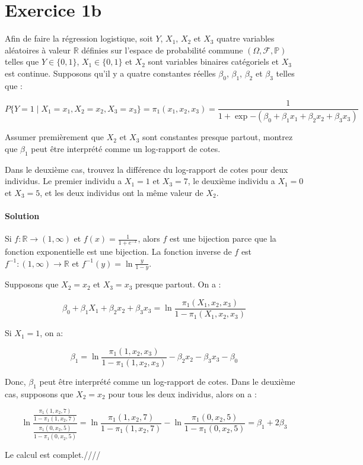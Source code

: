 \documentclass[../main.tex]{subfiles}
\begin{document}
\section*{Exercice 1b}
\begin{CJK*}{UTF8}{gbsn}
Afin de faire la régression logistique, soit $Y$, $X_1$, $X_2$ et $X_3$ quatre 
variables aléatoires à valeur $\mathbb{R}$ définies sur 
l'espace de probabilité commune $(\Omega, \mathcal{F}, \mathbb{P})$ telles que 
$Y \in \{0,1\}$, $X_1 \in \{0,1\}$ et $X_2$ sont variables binaires catégoriels et $X_3$ est continue.
Supposons qu'il y a quatre constantes réelles $\beta_0$, $\beta_1$, $\beta_2$ et $\beta_3$ telles que :

\begin{equation*}
    P \{Y = 1 \mid X_1 = x_1, X_2 = x_2, X_3 = x_3 \} = \pi_1(x_1,x_2,x_3) = \frac{1}{1 + \exp{-(\beta_0 + \beta_1 x_1 + \beta_2 x_2 + \beta_3 x_3)}}
\end{equation*}

Assumer premièrement que $X_2$ et $X_3$ sont constantes presque partout, montrez que $\beta_1$ peut 
être interprété comme un log-rapport de cotes. 

Dans le deuxième cas, trouvez la différence du log-rapport de cotes pour deux individus.
Le premier individu a $X_1=1$ et $X_3 = 7$, le deuxième individu a $X_1=0$ et $X_3 = 5$, et les deux 
individus ont la même valeur de $X_2$.

\smallskip
\paragraph{Solution}
Si $f: \mathbb{R} \to (1, \infty)$ et $f(x) = \frac{1}{1+e^{-x}}$, alors $f$ est une bijection parce que la fonction exponentielle est une bijection.
La fonction inverse de $f$ est $f^{-1}: (1, \infty) \to \mathbb{R}$ et $f^{-1}(y) = \ln{\frac{y}{1-y}}$.

Supposons que $X_2 = x_2$ et $X_3 = x_3$ presque partout. On a :

\begin{equation*}
    \beta_0 + \beta_1 X_1 + \beta_2 x_2 + \beta_3 x_3 = \ln{\frac{ \pi_1(X_1,x_2,x_3)}{1-\pi_1(X_1,x_2,x_3)}}
\end{equation*}

Si $X_1 = 1$, on a:

\begin{equation*}
    \beta_1= \ln{\frac{ \pi_1(1,x_2,x_3)}{1-\pi_1(1,x_2,x_3)}} - \beta_2 x_2 - \beta_3 x_3 - \beta_0
\end{equation*}

Donc, $\beta_1$ peut être interprété comme un log-rapport de cotes.
Dans le deuxième cas, supposons que $X_2 = x_2$ pour tous les deux individus, alors on a :

\begin{equation*}
    \ln \frac{ \frac{\pi_1(1,x_2,7)}{1-\pi_1(1,x_2,7)}}{ \frac{\pi_1(0,x_2,5)}{1-\pi_1(0,x_2,5)}} =  
    \ln \frac{\pi_1(1,x_2,7)}{1-\pi_1(1,x_2,7)} - \ln \frac{\pi_1(0,x_2,5)}{1-\pi_1(0,x_2,5)} =  \beta_1 + 2\beta_3
\end{equation*}

Le calcul est complet.////
\end{CJK*}
\end{document}
